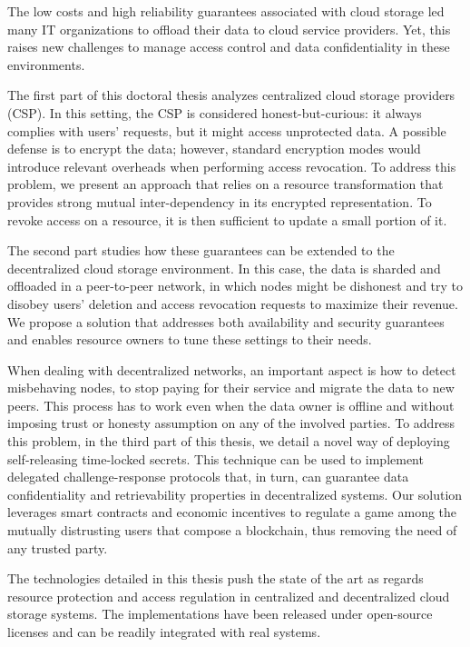 The low costs and high reliability guarantees associated with cloud storage led
many IT organizations to offload their data to cloud service providers. Yet,
this raises new challenges to manage access control and data confidentiality in
these environments.

The first part of this doctoral thesis analyzes centralized cloud storage
providers (CSP). In this setting, the CSP is considered honest-but-curious: it
always complies with users' requests, but it might access unprotected data. A
possible defense is to encrypt the data; however, standard encryption modes
would introduce relevant overheads when performing access revocation. To
address this problem, we present an approach that relies on a resource
transformation that provides strong mutual inter-dependency in its encrypted
representation. To revoke access on a resource, it is then sufficient to update
a small portion of it.

The second part studies how these guarantees can be extended to the
decentralized cloud storage environment. In this case, the data is sharded and
offloaded in a peer-to-peer network, in which nodes might be dishonest and try
to disobey users' deletion and access revocation requests to maximize their
revenue. We propose a solution that addresses both availability and security
guarantees and enables resource owners to tune these settings to their needs.

When dealing with decentralized networks, an important aspect is how to detect
misbehaving nodes, to stop paying for their service and migrate the data to new
peers. This process has to work even when the data owner is offline and without
imposing trust or honesty assumption on any of the involved parties. To address
this problem, in the third part of this thesis, we detail a novel way of
deploying self-releasing time-locked secrets. This technique can be used to
implement delegated challenge-response protocols that, in turn, can guarantee
data confidentiality and retrievability properties in decentralized systems.
Our solution leverages smart contracts and economic incentives to regulate a
game among the mutually distrusting users that compose a blockchain, thus
removing the need of any trusted party.

The technologies detailed in this thesis push the state of the art as regards
resource protection and access regulation in centralized and decentralized
cloud storage systems. The implementations have been released under
open-source licenses and can be readily integrated with real systems.
